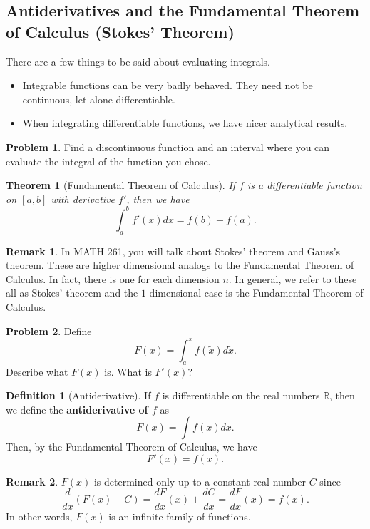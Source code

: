 \documentclass[12pt]{article}
\newcommand{\R}{\mathbb{R}}
\newtheorem{theorem}{Theorem}[section]
\theoremstyle{definition}
\newtheorem{definition}{Definition}[section]
\newtheorem{remark}{Remark}[section]
\newtheorem{problem}{Problem}[section]
\begin{document}
\subsection{Antiderivatives and the Fundamental Theorem of Calculus (Stokes' Theorem)}

There are a few things to be said about evaluating integrals.
\begin{itemize}
    \item Integrable functions can be very badly behaved.  They need not be continuous, let alone differentiable.
    \item When integrating differentiable functions, we have nicer analytical results.
\end{itemize}

\begin{problem}
Find a discontinuous function and an interval where you can evaluate the integral of the function you chose.
\end{problem}

\begin{theorem}[Fundamental Theorem of Calculus]
If $f$ is a differentiable function on $[a,b]$ with derivative $f'$, then we have
\[
\int_a^b f'(x)dx = f(b)-f(a).
\]
\end{theorem}

\begin{remark}
In MATH 261, you will talk about Stokes' theorem and Gauss's theorem.  These are higher dimensional analogs to the Fundamental Theorem of Calculus.  In fact, there is one for each dimension $n$.  In general, we refer to these all as Stokes' theorem and the $1$-dimensional case is the Fundamental Theorem of Calculus.
\end{remark}

\begin{problem}
Define
\[
F(x)=\int_a^x f(\tilde{x})d\tilde{x}.
\]
Describe what $F(x)$ is.  What is $F'(x)$?
\end{problem}

\begin{definition}[Antiderivative]
If $f$ is differentiable on the real numbers $\R$, then we define the \textbf{antiderivative of $f$} as
\[
F(x)=\int f(x)dx.
\]
Then, by the Fundamental Theorem of Calculus, we have
\[
F'(x)=f(x).
\]
\end{definition}

\begin{remark}
$F(x)$ is determined only up to a constant real number $C$ since
\[
\frac{d}{dx}(F(x)+C)=\frac{dF}{dx}(x)+\frac{dC}{dx}=\frac{dF}{dx}(x)=f(x).
\]
In other words, $F(x)$ is an infinite family of functions.
\end{remark}
\end{document}
